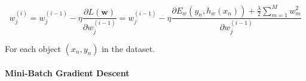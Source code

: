  \[ w_j^{(i)} = w_j^{(i-1)} - \eta \frac{\partial L(\textbf{w})}{\partial w_j^{(i-1)}}
              = w_{j}^{(i-1)} - \eta \frac{\partial E_w(y_n, h_w(x_n)) 
              + \frac{\lambda}{2}\sum_{m=1}^M w_m^2}{\partial w_j^{(i-1)}} 
 \]  

For each object $(x_n, y_n)$ in the dataset.
 

\paragraph{Mini-Batch Gradient Descent}\label{sec:mini-batch}






